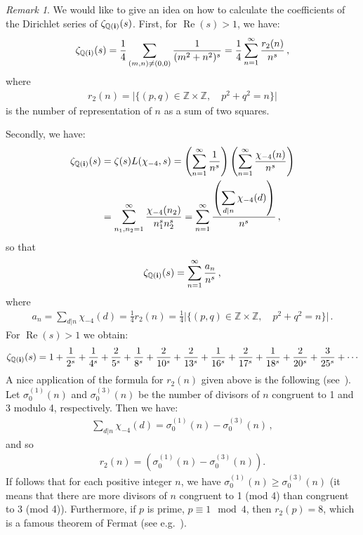 \documentclass[reqno]{amsart}
\theoremstyle{plain}
\theoremstyle{definition}
\theoremstyle{remark}
\newtheorem{remark}[theorem]{Remark}
\numberwithin{equation}{section}
\begin{document}
\begin{remark}
  \label{remark}
  We would like to give an idea on how to calculate the coefficients
  of the Dirichlet series of $\zeta_{{{\mathbb Q}}({{\bf i}})}(s)$. First, for
  ${{\operatorname{Re}}}(s)>1$, we have:
  \begin{align*}
    \zeta_{{{\mathbb Q}}({{\bf i}})}(s) = \frac14\sum_{(m,n)\neq(0,0)} \frac{1}{(m^2+n^2)^s}
    = \frac14\sum_{n=1}^\infty \frac{r_2(n)}{n^s}\,,
  \end{align*}
  where
  \begin{align*}
    r_2(n) = \big|\{(p,q)\in{{\mathbb Z}}\times{{\mathbb Z}},\quad p^2+q^2=n\}\big|
  \end{align*}
  is the number of representation of $n$ as a sum of two squares.

  Secondly, we have:
  \begin{align*}
    \zeta_{{{\mathbb Q}}({{\bf i}})}(s) &= \zeta(s) L(\chi_{-4},s) 
                        = \left(\sum_{n=1}^\infty \frac{1}{n^s}\right) 
                        \left(\sum_{n=1}^\infty \frac{\chi_{-4}(n)}{n^s}\right)\\
                      &= \sum_{n_1,n_2=1}^\infty \frac{\chi_{-4}(n_2)}{n_1^sn_2^s}
                        = \sum_{n=1}^\infty \frac{\left(\displaystyle\sum_{d | n} \chi_{-4}(d)\right)}{n^s}\,,
  \end{align*}
  so that 
  \begin{align*}
    \zeta_{{{\mathbb Q}}({{\bf i}})}(s) = \sum_{n=1}^\infty \frac{a_n}{n^s}\,,
  \end{align*}
  where
  \begin{align*}
    a_n = \sum_{d | n} \chi_{-4}(d) = \frac14 r_2(n)
    = \frac14 \big|\{(p,q)\in{{\mathbb Z}}\times{{\mathbb Z}},\quad p^2+q^2=n\}\big|\,.
  \end{align*}
  For ${{\operatorname{Re}}}(s)>1$ we obtain:
  \begin{align*}
    \zeta_{{{\mathbb Q}}({{\bf i}})}(s) = 1 + \frac{1}{2^s} + \frac{1}{4^s} + \frac{2}{5^s} 
    + \frac{1}{8^s} + \frac{2}{10^s} + \frac{2}{13^s} 
    + \frac{1}{16^s} + \frac{2}{17^s} + \frac{1}{18^s} + \frac{2}{20^s} 
    + \frac{3}{25^s} + \cdots
  \end{align*}
  A nice application of the formula for $r_2(n)$ given above is the
  following (see~\cite{rademacher}). Let $\sigma_0^{(1)}(n)$ and
  $\sigma_0^{(3)}(n)$ be the number of divisors of $n$ congruent to 1
  and 3 modulo 4, respectively. Then we have:
  \begin{align*}
    \sum_{d | n} \chi_{-4}(d) =  \sigma_0^{(1)}(n) - \sigma_0^{(3)}(n)\,,
  \end{align*}
  and so
  \begin{align*}
    r_2(n) =  \left(\sigma_0^{(1)}(n) - \sigma_0^{(3)}(n)\right).
  \end{align*}
  If follows that for each positive integer $n$, we have
  $\sigma_0^{(1)}(n) \geq \sigma_0^{(3)}(n)$ (it means that there are
  more divisors of $n$ congruent to 1 (mod 4) than congruent to 3 (mod
  4)). Furthermore, if $p$ is prime, $p\equiv 1\mod 4$, then $r_2(p)=8$,
  which is a famous theorem of Fermat (see e.g.~\cite{rademacher}).
\end{remark}
\end{document}
